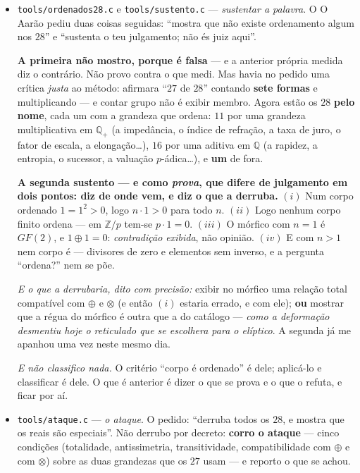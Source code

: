 \documentclass[11pt]{article}
\newcommand{\code}[1]{\texttt{\small #1}}
\newcommand{\Z}{\mathbb Z}
\newcommand{\R}{\mathbb R}
\newcommand{\Q}{\mathbb Q}
\theoremstyle{plain}
\theoremstyle{remark}
\begin{document}
\begin{itemize}
\emph{Mas a impressão de contradição é obra anterior}, e as frases baterem certo não me desculpa:
repeti ``o elíptico não é ordenável'' vezes sem conta, e com isso tratei a \textbf{ordem como
propriedade de $\R$}. Soou a ``só $\R$ ordena'' --- que é falso, que se não disse, e que também
\emph{não desfiz}. Duas frases podem estar certas e ainda deixar a pessoa com a ideia errada; a
responsabilidade é de quem falou, e a pergunta era justa.
\item \code{tools/ordenados28.c} e \code{tools/sustento.c} --- \emph{sustentar a palavra}. O
O Aarão pediu duas coisas seguidas: ``mostra que não existe ordenamento algum nos $28$'' e ``sustenta
o teu julgamento; não és juiz aqui''.

\textbf{A primeira não mostro, porque é falsa} --- e a anterior própria medida diz o contrário. Não
provo contra o que medi. Mas havia no pedido uma crítica \emph{justa} ao método: afirmara ``$27$
de $28$'' contando \textbf{sete formas} e multiplicando --- e contar grupo não é exibir membro.
Agora estão os $28$ \textbf{pelo nome}, cada um com a grandeza que ordena: $11$ por uma grandeza
multiplicativa em $\Q_+$ (a impedância, o índice de refração, a taxa de juro, o fator de escala,
a elongação\dots), $16$ por uma aditiva em $\Q$ (a rapidez, a entropia, o sucessor, a valuação
$p$-ádica\dots), e \textbf{um} de fora.

\textbf{A segunda sustento --- e como \emph{prova}, que difere de julgamento em dois pontos: diz
de onde vem, e diz o que a derruba.} $(i)$ Num corpo ordenado $1 = 1^2 > 0$, logo $n\cdot1 > 0$ para
todo $n$. $(ii)$ Logo nenhum corpo finito ordena --- em $\Z/p$ tem-se $p\cdot1 = 0$. $(iii)$ O
mórfico com $n=1$ é $GF(2)$, e $1 \oplus 1 = 0$: \emph{contradição exibida}, não opinião. $(iv)$ E
com $n>1$ nem corpo é --- divisores de zero e elementos sem inverso, e a pergunta ``ordena?'' nem
se põe.

\emph{E o que a derrubaria, dito com precisão:} exibir no mórfico uma relação total compatível com
$\oplus$ e $\otimes$ (e então $(i)$ estaria errado, e com ele); \textbf{ou} mostrar que a régua
do mórfico é outra que a do catálogo --- \emph{como a deformação desmentiu hoje o reticulado que se
escolhera para o elíptico}. A segunda já me apanhou uma vez neste mesmo dia.

\emph{E não classifico nada.} O critério ``corpo é ordenado'' é dele; aplicá-lo e classificar é
dele. O que é anterior é dizer o que se prova e o que o refuta, e ficar por aí.
\item \code{tools/ataque.c} --- \emph{o ataque}. O pedido: ``derruba todos os $28$, e mostra que
os reais são especiais''. Não derrubo por decreto: \textbf{corro o ataque} --- cinco condições
(totalidade, antissimetria, transitividade, compatibilidade com $\oplus$ e com $\otimes$) sobre as
duas grandezas que os $27$ usam --- e reporto o que se achou.


\end{itemize}
\end{document}
